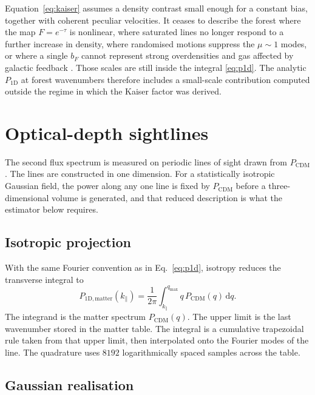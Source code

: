 \documentclass[11pt]{article}
\begin{document}
Equation~\eqref{eq:kaiser} assumes a density contrast small enough for a constant bias, together with coherent peculiar velocities.
It ceases to describe the forest where the map $F=e^{-\tau}$ is nonlinear, where saturated lines no longer respond to a further increase in density, where randomised motions suppress the $\mu\sim 1$ modes, or where a single $b_F$ cannot represent strong overdensities and gas affected by galactic feedback \citep{Kooistra:2022hzw}.
Those scales are still inside the integral \eqref{eq:p1d}.
The analytic $P_{1\mathrm{D}}$ at forest wavenumbers therefore includes a small-scale contribution computed outside the regime in which the Kaiser factor was derived.

\section{Optical-depth sightlines}
\label{sec:sightlines}

The second flux spectrum is measured on periodic lines of sight drawn from $P_\mathrm{CDM}$.
The lines are constructed in one dimension.
For a statistically isotropic Gaussian field, the power along any one line is fixed by $P_\mathrm{CDM}$ before a three-dimensional volume is generated, and that reduced description is what the estimator below requires.

\subsection{Isotropic projection}
\label{sec:projection}

With the same Fourier convention as in Eq.~\eqref{eq:p1d}, isotropy reduces the transverse integral to
\begin{equation}
\label{eq:matter1d}
P_{1\mathrm{D},\mathrm{matter}}(k_\parallel)
=
\frac{1}{2\pi}
\int_{k_\parallel}^{q_\mathrm{max}}
q\,P_\mathrm{CDM}(q)\,\mathrm{d}q.
\end{equation}
The integrand is the matter spectrum $P_\mathrm{CDM}(q)$.
The upper limit is the last wavenumber stored in the matter table.
The integral is a cumulative trapezoidal rule taken from that upper limit, then interpolated onto the Fourier modes of the line.
The quadrature uses $8192$ logarithmically spaced samples across the table.

\subsection{Gaussian realisation}
\label{sec:gaussian}
\end{document}
